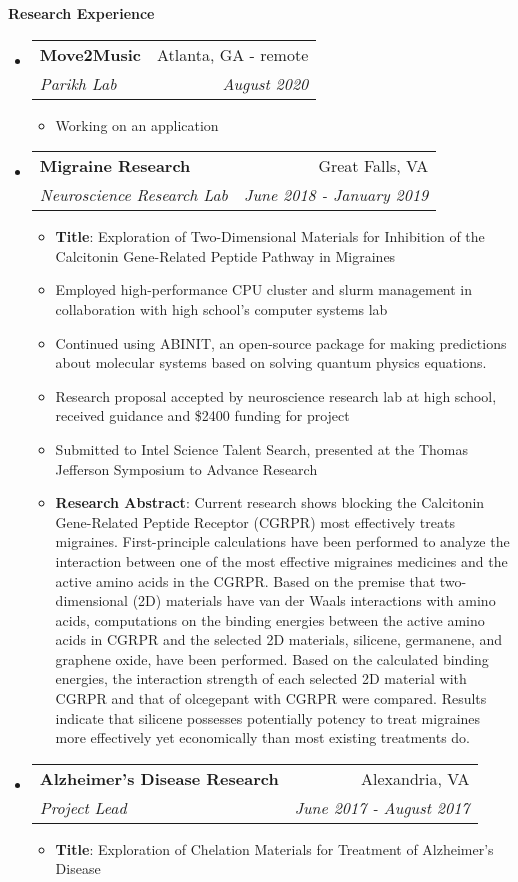 \documentclass[letterpaper,11pt]{article}
\makeatletter
\newcommand{\resitem}[1]{\item #1 \vspace{-2pt}}
\newcommand{\resheading}[1]{{\large \colorbox{mygrey}{\begin{minipage}{\textwidth}{\textbf{#1 \vphantom{p\^{E}}}}\end{minipage}}}}
\newcommand{\ressubheading}[4]{
\begin{tabular*}{7.0in}{l@{\extracolsep{\fill}}r}
		\textbf{#1} & #2 \\
		\textit{#3} & \textit{#4} \\
\end{tabular*}\vspace{-6pt}}
\makeatother
\begin{document}
\resheading{Research Experience}
\begin{itemize}
\item
    \ressubheading{Move2Music}{Atlanta, GA - remote}{Parikh Lab}{August 2020}
    \begin{itemize}
        \resitem{Working on an application }
    \end{itemize}
\item
	\ressubheading{Migraine Research}{Great Falls, VA}{Neuroscience Research Lab}{June 2018 - January 2019}
	\begin{itemize}
		\resitem{\textbf{Title}: Exploration of Two-Dimensional Materials for Inhibition of the Calcitonin Gene-Related Peptide Pathway in Migraines}
	    \resitem{Employed high-performance CPU cluster and slurm management in collaboration with high school's computer systems lab}
	    \resitem{Continued using ABINIT, an open-source package for making predictions about molecular systems based on solving quantum physics equations.}
	    \resitem{Research proposal accepted by neuroscience research lab at high school, received guidance and \$2400 funding for project}
	    \resitem{Submitted to Intel Science Talent Search, presented at the Thomas Jefferson Symposium to Advance Research}
		\resitem{\textbf{Research Abstract}: \footnotesize{Current research shows blocking the Calcitonin Gene-Related Peptide Receptor (CGRPR) most effectively treats migraines. First-principle calculations have been performed to analyze the interaction between one of the most effective migraines medicines and the active amino acids in the CGRPR. Based on the premise that two-dimensional (2D) materials have van der Waals interactions with amino acids, computations on the binding energies between the active amino acids in CGRPR and the selected 2D materials, silicene, germanene, and graphene oxide, have been performed. Based on the calculated binding energies, the interaction strength of each selected 2D material with CGRPR and that of olcegepant with CGRPR were compared. Results indicate that silicene possesses potentially potency to treat migraines more effectively yet economically than most existing treatments do.}}
	\end{itemize}
\item
	\ressubheading{Alzheimer's Disease Research}{Alexandria, VA}{Project Lead}{June 2017 - August 2017}
	\begin{itemize}
	    \resitem{\textbf{Title}: Exploration of Chelation Materials for Treatment of Alzheimer's Disease}

\end{itemize}
\end{itemize}
\end{document}
